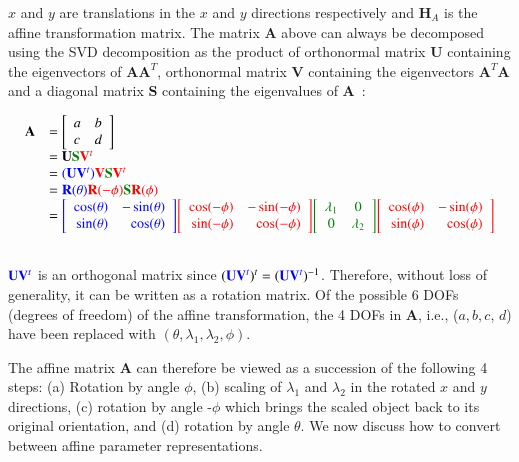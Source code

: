\begin{Body}
$x$ and $y$ are translations in the $x$ and $y$ directions respectively and $\mathbf{H}_A$ is the affine transformation matrix.  The matrix $\mathbf{A}$ above can always be decomposed using the SVD decomposition as the product of orthonormal matrix $\mathbf{U}$ containing the eigenvectors of $\mathbf{A}\mathbf{A}^T$, orthonormal matrix $\mathbf{V}$ containing the eigenvectors  $\mathbf{A}^T\mathbf{A}$ and a diagonal matrix $\mathbf{S}$ containing the eigenvalues of $\mathbf{A}$~\cite{2004_BOOK_CG_Hartley}:

\begin{equation}
\begin{array}{llllllll}
\mathbf{A} &= \left[\begin{array}{lll}a & b \\ c & d\\ \end{array}\right] \\
&=\mathbf{U}{\color{darkgreen}\mathbf{S}}{\color{red}\mathbf{V}^t} \\
&={\color{blue}(\mathbf{U}\mathbf{V}^t)}{\color{red}\mathbf{V}}{\color{darkgreen}\mathbf{S}}{\color{red}\mathbf{V}^t}\\
&={\color{blue}\mathbf{R}(\theta)}{\color{red}\mathbf{R}(-\phi)}{\color{darkgreen}\mathbf{S}}{\color{red}\mathbf{R} (\phi)}\\
&={\color{blue}\RotMatrixTheta}{\color{red}\RotMatrixminusPhi}{\color{darkgreen}\EigenvalueMatrix}{\color{red}\RotMatrixPhi}\\\\
\end{array}
\label{Eq:AffineDecomposition}
\end{equation}

${\color{blue}\mathbf{U}\mathbf{V}^t}$ is an orthogonal matrix since $({\color{blue}\mathbf{U}\mathbf{V}^t})^t =({\color{blue}\mathbf{U}\mathbf{V}^t})^{-1}$.  Therefore, without loss of generality, it can be written as a rotation matrix.  Of the possible 6 DOFs (degrees of freedom) of the affine transformation, the 4 DOFs in $\mathbf{A}$, i.e., ($a, b, c$, $d$) have been replaced with $(\theta, \lambda_1, \lambda_2, \phi)$.

The affine matrix $\mathbf{A}$ can therefore be viewed as a succession of the following 4 steps: (a) Rotation by angle $\phi$, (b) scaling of $\lambda_1$ and $\lambda_2$ in the rotated $x$ and $y$ directions, (c) rotation by angle -$\phi$ which brings the scaled object back to its original orientation, and (d) rotation by angle $\theta$.  We now discuss how to convert between affine parameter representations.


\end{Body}
